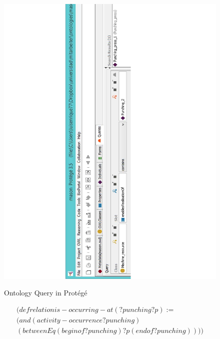 \begin{figure}
	\begin{center}
		\includegraphics[scale=0.8]{figure-chapterIV/fig4-5}\\
		\caption{Ontology Query in Protégé}
		\label{figure4-5}
	\end{center}
\end{figure}


\begin{equation}\label{eq4.2}	
	\begin{split}
		(defrelation is-occurring-at (?punching ?p) := \\
		(and (activity-occurrence ?punching) \\
		(betweenEq (beginof ?punching) ?p (endof ?punching)))) 
	\end{split}
\end{equation}\\

